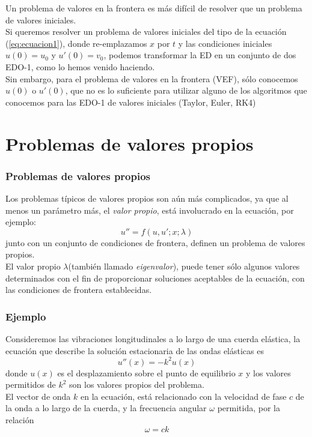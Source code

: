 \begin{frame}
Un problema de valores en la frontera es más difícil de resolver que un problema de valores iniciales.
\\
\medskip
Si queremos resolver un problema de valores iniciales del tipo de la ecuación (\ref{eq:ecuacion1}), donde re-emplazamos $x$ por $t$ y las condiciones iniciales $u(0) = u_{0}$ y $u'(0) = v_{0}$, podemos transformar la ED en un conjunto de dos EDO-1, como lo hemos venido haciendo.
\\
\medskip
Sin embargo, para el problema de valores en la frontera (VEF), sólo conocemos $u(0)$ o $u'(0)$, que no es lo suficiente para utilizar alguno de los algoritmos que conocemos para las EDO-1 de valores iniciales (Taylor, Euler, RK4)
\end{frame}
\section{Problemas de valores propios}
\begin{frame}
\frametitle{Problemas de valores propios}
Los problemas típicos de valores propios son aún más complicados, ya que al menos un parámetro más, el \emph{valor propio}, está involucrado en la ecuación, por ejemplo:
\begin{equation}
u'' = f(u, u'; x; \lambda)
\label{eq:ecuacion_vp}
\end{equation}
junto con un conjunto de condiciones de frontera, definen un problema de valores propios.
\\
\medskip
El valor propio $\lambda$(también llamado \emph{eigenvalor}), puede tener sólo algunos valores determinados  con el fin de proporcionar soluciones aceptables de la ecuación, con las condiciones de frontera establecidas.
\end{frame}
\begin{frame}
\frametitle{Ejemplo}
Consideremos las vibraciones longitudinales a lo largo de una cuerda elástica, la ecuación que describe la solución estacionaria de las ondas elásticas es
\begin{equation}
u''(x) = - k^{2} u(x)
\end{equation}
donde $u(x)$ es el desplazamiento sobre el punto de equilibrio $x$ y los valores permitidos de $k^{2}$ son los valores propios del problema.
\\
\medskip
El vector de onda $k$ en la ecuación, está relacionado con la velocidad de fase $c$ de la onda a lo largo de la cuerda, y la frecuencia angular $\omega$ permitida, por la relación
\begin{equation}
\omega = ck
\end{equation}
\end{frame}

